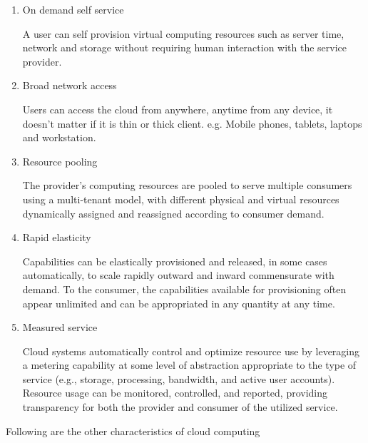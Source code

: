 \par
\begin{enumerate}
\item On demand self service
    \par A user can self provision virtual computing resources such as server time, network and storage without requiring human interaction with the service provider\cite{wiki}.
\item Broad network access
    \par Users can access the cloud from anywhere, anytime from any device, it doesn't matter if it is thin or thick client. e.g. Mobile phones, tablets, laptops and workstation\cite{wiki}. 
\item Resource pooling
    \par The provider's computing resources are pooled to serve multiple consumers using a multi-tenant model, with different physical and virtual resources dynamically assigned and reassigned according to consumer demand\cite{wiki}. 
\item Rapid elasticity
    \par Capabilities can be elastically provisioned and released, in some cases automatically, to scale rapidly outward and inward commensurate with demand. To the consumer, the capabilities available for provisioning often appear unlimited and can be appropriated in any quantity at any time\cite{wiki}.
\item Measured service
    \par Cloud systems automatically control and optimize resource use by leveraging a metering capability at some level of abstraction appropriate to the type of service (e.g., storage, processing, bandwidth, and active user accounts). Resource usage can be monitored, controlled, and reported, providing transparency for both the provider and consumer of the utilized service\cite{wiki}.
\end{enumerate}

\par Following are the other characteristics of cloud computing

